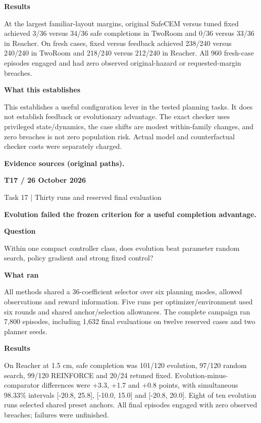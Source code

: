 \documentclass[11pt,a4paper]{article}
\newcommand{\block}[2]{\par\textbf{\color{ink}#1}\par\nopagebreak #2\par}
\newcommand{\finding}[1]{\begin{tcolorbox}[colback=pale,colframe=pale,boxrule=0pt,arc=1mm,left=10pt,right=10pt,top=10pt,bottom=10pt]\color{ink}\large\bfseries #1\end{tcolorbox}}
\begin{document}
\block{Results}{At the largest familiar-layout margins, original SafeCEM versus tuned fixed achieved 3/36 versus 34/36 safe completions in TwoRoom and 0/36 versus 33/36 in Reacher. On fresh cases, fixed versus feedback achieved 238/240 versus 240/240 in TwoRoom and 218/240 versus 212/240 in Reacher. All 960 fresh-case episodes engaged and had zero observed original-hazard or requested-margin breaches.}
\block{What this establishes}{This establishes a useful configuration lever in the tested planning tasks. It does not establish feedback or evolutionary advantage. The exact checker uses privileged state/dynamics, the case shifts are modest within-family changes, and zero breaches is not zero population risk. Actual model and counterfactual checker costs were separately charged.}
\vfill{\footnotesize\color{muted}\textbf{Evidence sources (original paths).}\par
\raggedright {}\par {}\par {}}
\clearpage
{}\label{exp:T17}
{\color{accent}\small\bfseries T17 / 26 October 2026}\par
{}\par
{\color{muted}\small Task 17 | Thirty runs and reserved final evaluation}\par\vspace{2mm}
\finding{Evolution failed the frozen criterion for a useful completion advantage.}
\block{Question}{Within one compact controller class, does evolution beat parameter random search, policy gradient and strong fixed control?}
\block{What ran}{All methods shared a 36-coefficient selector over six planning modes, allowed observations and reward information. Five runs per optimizer/environment used six rounds and shared anchor/selection allowances. The complete campaign ran 7,800 episodes, including 1,632 final evaluations on twelve reserved cases and two planner seeds.}
\block{Results}{On Reacher at 1.5 cm, safe completion was 101/120 evolution, 97/120 random search, 99/120 REINFORCE and 20/24 retuned fixed. Evolution-minus-comparator differences were +3.3, +1.7 and +0.8 points, with simultaneous 98.33\% intervals [-20.8, 25.8], [-10.0, 15.0] and [-20.8, 20.0]. Eight of ten evolution runs selected shared preset anchors. All final episodes engaged with zero observed breaches; failures were unfinished.}
\end{document}
